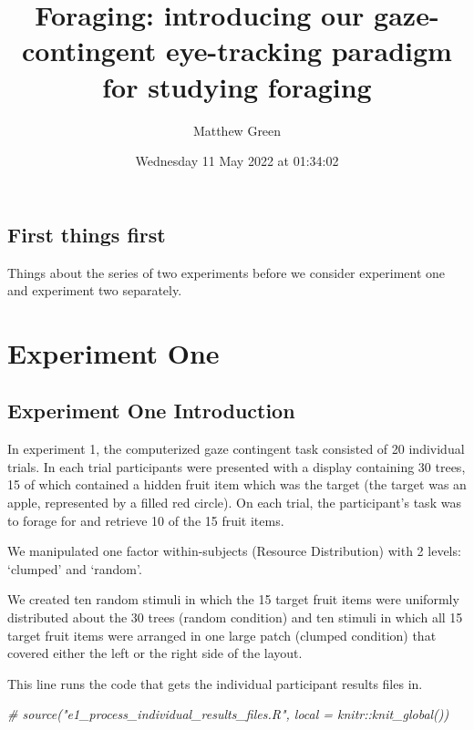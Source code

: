 \documentclass[
]{book}
\title{Foraging: introducing our gaze-contingent eye-tracking paradigm for studying foraging}
\author{Matthew Green}
\date{Wednesday 11 May 2022 at 01:34:02}
\newenvironment{Shaded}{\begin{snugshade}}{\end{snugshade}}
\newcommand{\CommentTok}[1]{\textcolor[rgb]{0.56,0.35,0.01}{\textit{#1}}}
\begin{document}
\maketitle

{
\setcounter{tocdepth}{1}
\tableofcontents
}
\hypertarget{first-things-first}{%
\chapter{First things first}\label{first-things-first}}

Things about the series of two experiments before we consider experiment one and experiment two separately.

\hypertarget{part-experiment-one}{%
\part{Experiment One}\label{part-experiment-one}}

\hypertarget{experiment-one-introduction}{%
\chapter{Experiment One Introduction}\label{experiment-one-introduction}}

In experiment 1, the computerized gaze contingent task consisted of 20 individual trials. In each trial participants were presented with a display containing 30 trees, 15 of which contained a hidden fruit item which was the target (the target was an apple, represented by a filled red circle). On each trial, the participant's task was to forage for and retrieve 10 of the 15 fruit items.

We manipulated one factor within-subjects (Resource Distribution) with 2 levels: `clumped' and `random'.

We created ten random stimuli in which the 15 target fruit items were uniformly distributed about the 30 trees (random condition) and ten stimuli in which all 15 target fruit items were arranged in one large patch (clumped condition) that covered either the left or the right side of the layout.

This line runs the code that gets the individual participant results files in.

\begin{Shaded}
\begin{Highlighting}[]
\CommentTok{\# source("e1\_process\_individual\_results\_files.R", local = knitr::knit\_global())}
\end{Highlighting}
\end{Shaded}
\end{document}
